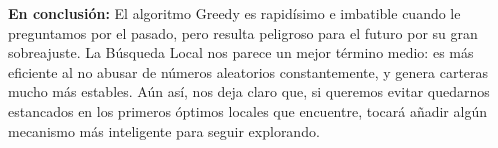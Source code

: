 \textbf{En conclusión:} El algoritmo Greedy es rapidísimo e imbatible cuando le preguntamos por el pasado, pero resulta peligroso para el futuro por su gran sobreajuste. La Búsqueda Local nos parece un mejor término medio: es más eficiente al no abusar de números aleatorios constantemente, y genera carteras mucho más estables. Aún así, nos deja claro que, si queremos evitar quedarnos estancados en los primeros óptimos locales que encuentre, tocará añadir algún mecanismo más inteligente para seguir explorando.
